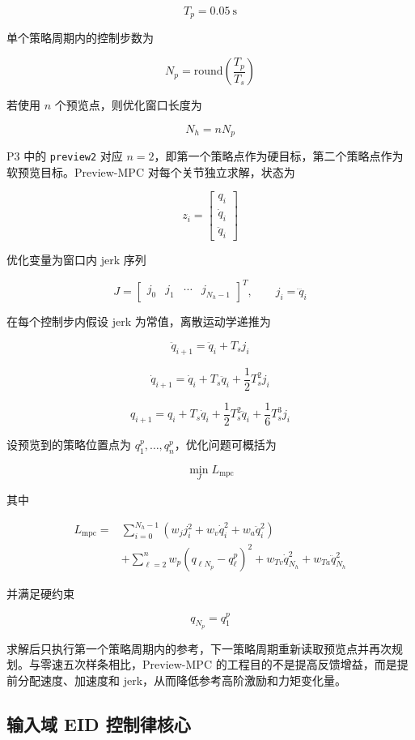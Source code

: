 \documentclass[12pt,a4paper]{ctexart}
\begin{document}
\[
T_p=0.05\ \mathrm{s}
\]

单个策略周期内的控制步数为

\[
N_p=\mathrm{round}\left(\frac{T_p}{T_s}\right)
\]

若使用 $n$ 个预览点，则优化窗口长度为

\[
N_h=nN_p
\]

P3 中的 \texttt{preview2} 对应 $n=2$，即第一个策略点作为硬目标，第二个策略点作为软预览目标。Preview-MPC 对每个关节独立求解，状态为

\[
z_i=
\begin{bmatrix}
q_i\\
\dot q_i\\
\ddot q_i
\end{bmatrix}
\]

优化变量为窗口内 jerk 序列

\[
J=
\begin{bmatrix}
j_0 & j_1 & \cdots & j_{N_h-1}
\end{bmatrix}^{T},
\qquad
j_i=\dddot q_i
\]

在每个控制步内假设 jerk 为常值，离散运动学递推为

\[
\ddot q_{i+1}=\ddot q_i+T_s j_i
\]

\[
\dot q_{i+1}
=
\dot q_i+T_s\ddot q_i+\frac{1}{2}T_s^2j_i
\]

\[
q_{i+1}
=
q_i+T_s\dot q_i+\frac{1}{2}T_s^2\ddot q_i+\frac{1}{6}T_s^3j_i
\]

设预览到的策略位置点为 $q_1^p,\ldots,q_n^p$，优化问题可概括为

\[
\min_J L_\mathrm{mpc}
\]

其中

\[
\begin{aligned}
L_\mathrm{mpc}
=&
\sum_{i=0}^{N_h-1}
\left(
w_j j_i^2
+w_v\dot q_i^2
+w_a\ddot q_i^2
\right)\\
&+
\sum_{\ell=2}^{n}
w_p
\left(q_{\ell N_p}-q_\ell^p\right)^2
+w_{Tv}\dot q_{N_h}^2
+w_{Ta}\ddot q_{N_h}^2
\end{aligned}
\]

并满足硬约束

\[
q_{N_p}=q_1^p
\]

求解后只执行第一个策略周期内的参考，下一策略周期重新读取预览点并再次规划。与零速五次样条相比，Preview-MPC 的工程目的不是提高反馈增益，而是提前分配速度、加速度和 jerk，从而降低参考高阶激励和力矩变化量。

\subsection{输入域 EID 控制律核心}
\end{document}
